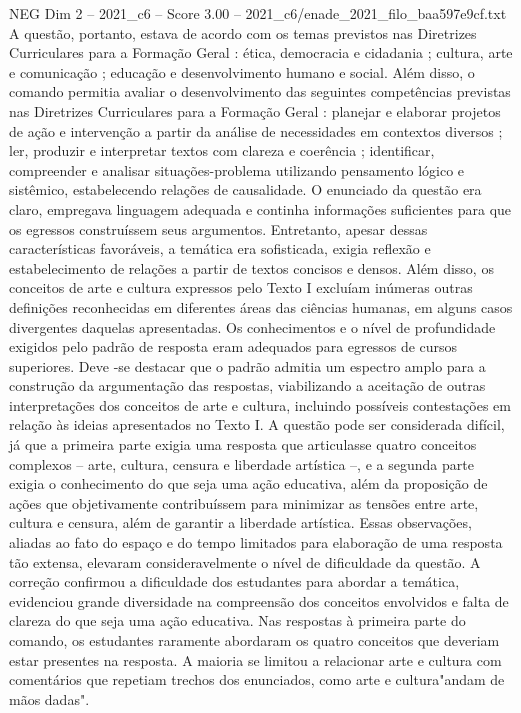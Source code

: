 \begin{textsample}{NEG Dim 2 – 2021\_c6 – Score 3.00 – 2021\_c6/enade\_2021\_filo\_baa597e9cf.txt}
A questão, portanto, estava de acordo com os temas previstos nas Diretrizes Curriculares para a Formação Geral : ética, democracia e cidadania ; cultura, arte e comunicação ; educação e desenvolvimento humano e social.
Além disso, o comando permitia avaliar o desenvolvimento das seguintes competências previstas nas Diretrizes Curriculares para a Formação Geral : planejar e elaborar projetos de ação e intervenção a partir da análise de necessidades em contextos diversos ; ler, produzir e interpretar textos com clareza e coerência ; identificar, compreender e analisar situações-problema utilizando pensamento lógico e sistêmico, estabelecendo relações de causalidade.
O enunciado da questão era claro, empregava linguagem adequada e continha informações suficientes para que os egressos construíssem seus argumentos.
Entretanto, apesar dessas características favoráveis, a temática era sofisticada, exigia reflexão e estabelecimento de relações a partir de textos concisos e densos.
Além disso, os conceitos de arte e cultura expressos pelo Texto I excluíam inúmeras outras definições reconhecidas em diferentes áreas das ciências humanas, em alguns casos divergentes daquelas apresentadas.
Os conhecimentos e o nível de profundidade exigidos pelo padrão de resposta eram adequados para egressos de cursos superiores.
Deve -se destacar que o padrão admitia um espectro amplo para a construção da argumentação das respostas, viabilizando a aceitação de outras interpretações dos conceitos de arte e cultura, incluindo possíveis contestações em relação às ideias apresentados no Texto I.
A questão pode ser considerada difícil, já que a primeira parte exigia uma resposta que articulasse quatro conceitos complexos – arte, cultura, censura e liberdade artística –, e a segunda parte exigia o conhecimento do que seja uma ação educativa, além da proposição de ações que objetivamente contribuíssem para minimizar as tensões entre arte, cultura e censura, além de garantir a liberdade artística.
Essas observações, aliadas ao fato do espaço e do tempo limitados para elaboração de uma resposta tão extensa, elevaram consideravelmente o nível de dificuldade da questão.
A correção confirmou a dificuldade dos estudantes para abordar a temática, evidenciou grande diversidade na compreensão dos conceitos envolvidos e falta de clareza do que seja uma ação educativa.
Nas respostas à primeira parte do comando, os estudantes raramente abordaram os quatro conceitos que deveriam estar presentes na resposta.
A maioria se limitou a relacionar arte e cultura com comentários que repetiam trechos dos enunciados, como arte e cultura"andam de mãos dadas".

\end{textsample}

